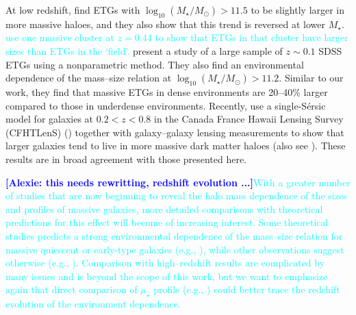 \documentclass[a4paper,fleqn,usenatbib]{mnras}
\def\ser{{S\'{e}rsic\ }}
\def\mstar{{$M_{\star}$}}
\def\logms{{$\log_{10} (M_{\star}/M_{\odot})$}}
\def\mden{{$\mu_{\star}$}}
\newcommand{\song}[1]{\textcolor{cyan}{#1}}
\newcommand{\alexie}[1]{\textcolor{blue}{\textbf{[Alexie: #1]}}}
\begin{document}
    At low redshift, \citet{Cerbrian2014} find ETGs with \logms{}$>11.5$ to be slightly larger in more massive haloes, and they also show that this trend is 
    reversed at lower \mstar{}. 
    \song{
    \citet{Kuchner2017} use one massive cluster at $z=0.44$ to show that ETGs in 
    that cluster have larger sizes than ETGs in the `field'. 
    }
    \citet{Yoon2017} present a study of a large sample of $z\sim0.1$ SDSS 
    ETGs using a nonparametric method. They also find an environmental dependence of the mass--size relation at \logms{}$>11.2$. Similar to our work, they find that massive ETGs in dense environments 
    are 20--40\% larger compared to those in underdense environments.
    Recently, \citet{Charlton2017} use a single-\ser{} model for galaxies at 
    $0.2 < z < 0.8$ in the Canada France Hawaii Lensing Survey (CFHTLenS) 
    (\citealt{Heymans2012}) together with galaxy--galaxy 
    lensing measurements to show that larger galaxies tend to live in more massive 
    dark matter haloes (also see \citealt{Sonnenfeld2017}).
    These results are in broad agreement with those presented here.
    
    \alexie{this needs rewritting, redshift evolution ...}\song{With a greater number of studies that are now beginning to reveal the halo mass dependence of the sizes and profiles of massive galaxies, more detailed comparisons with theoretical predictions for this effect will become of increasing interest.  Some theoretical studies predicts a strong environmental dependence of the mass--size relation 
    for massive quiescent or early-type galaxies
    (e.g., \citealt{Papovich2012, Bassett2013, Lani2013, Strazzullo2013, 
    Delaye2014}), while other observations suggest otherwise (e.g., 
    \citealt{Rettura2010, Raichoor2012, Kelkar2015, Allen2015}). 
    Comparison with high--redshift results are complicated by many issues and 
    is beyond the scope of this work, but we want to emphasize again that 
    direct comparison of \mden{} profile (e.g., \citealt{Szomoru2012, Patel2013, 
    Buitrago2017, Hill2017}) could better trace the redshift evolution of the
    environment dependence. 
    }
    
\end{document}
